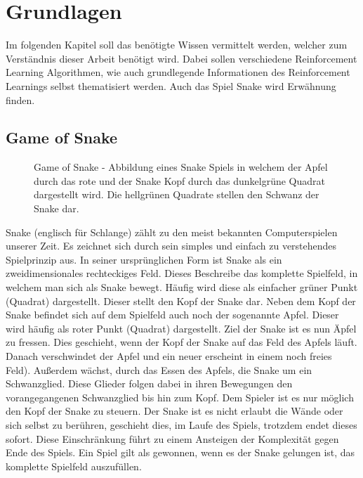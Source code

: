 
\chapter{Grundlagen}\label{sec:Grundlagen}
Im folgenden Kapitel soll das benötigte Wissen vermittelt werden, welcher zum Verständnis dieser Arbeit benötigt wird. Dabei sollen verschiedene Reinforcement Learning Algorithmen, wie auch grundlegende Informationen des Reinforcement Learnings selbst thematisiert werden. Auch das Spiel Snake wird Erwähnung finden. 
\section{Game of Snake} \label{sec:Snake}
\begin{figure}[H]
	\centering
	\def\svgscale{0.90}
	
	\caption[Game of Snake]{Game of Snake - Abbildung eines Snake Spiels in welchem der Apfel durch das rote und der Snake Kopf durch das dunkelgrüne Quadrat dargestellt wird. Die hellgrünen Quadrate stellen den Schwanz der Snake dar.}
	\label{fig:Game_of_Snake}
\end{figure}
Snake (englisch für Schlange) zählt zu den meist bekannten Computerspielen unserer Zeit. Es zeichnet sich durch sein simples und einfach zu verstehendes Spielprinzip aus.
In seiner ursprünglichen Form ist Snake als ein zweidimensionales rechteckiges Feld. Dieses Beschreibe das komplette Spielfeld, in welchem man sich als Snake bewegt. Häufig wird diese als einfacher grüner Punkt (Quadrat) dargestellt. Dieser stellt den Kopf der Snake dar. Neben dem Kopf der Snake befindet sich auf dem Spielfeld auch noch der sogenannte Apfel. Dieser wird häufig als roter Punkt (Quadrat) dargestellt.
Ziel der Snake ist es nun Äpfel zu fressen. Dies geschieht, wenn der Kopf der Snake auf das Feld des Apfels läuft. Danach verschwindet der Apfel und ein neuer erscheint in einem noch freies Feld). Außerdem wächst, durch das Essen des Apfels, die Snake um ein Schwanzglied. Diese Glieder folgen dabei in ihren Bewegungen den vorangegangenen Schwanzglied bis hin zum Kopf. Dem Spieler ist es nur möglich den Kopf der Snake zu steuern.
Der Snake ist es nicht erlaubt die Wände oder sich selbst zu berühren, geschieht dies, im Laufe des Spiels, trotzdem endet dieses sofort. Diese Einschränkung führt zu einem Ansteigen der Komplexität gegen Ende des Spiels. Ein Spiel gilt als gewonnen, wenn es der Snake gelungen ist, das komplette Spielfeld auszufüllen.

